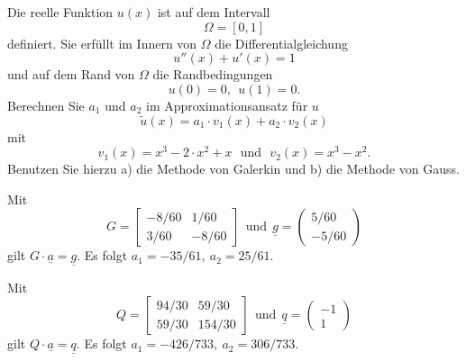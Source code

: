 Die reelle Funktion $u(x)$ ist auf dem Intervall
\[
\Omega = [0, 1]
\]
definiert. Sie erfüllt im Innern von $\Omega$ die Differentialgleichung
\[
u''(x) + u'(x) = 1
\]
und auf dem Rand von $\Omega$ die Randbedingungen
\[
u(0) = 0, \ \ u(1) = 0.
\]
Berechnen Sie $a_1$ und $a_2$ im Approximationsansatz für $u$
\[
\tilde u(x) = a_1 \cdot v_1(x) + a_2 \cdot v_2(x)
\]
mit
\[
v_1(x) = x^3 - 2 \cdot x^2 + x \ \ \ \text{und} \ \ \  v_2(x) = x^3 - x^2.
\]
Benutzen Sie hierzu  a) die Methode von Galerkin und b) die Methode von Gauss.

\begin{loesung}
\begin{teilaufgaben}
\item
Mit 
\[
G = \left[\begin{array}{rr} -8/60 & 1/60 \\ 3/60 & -8/60  \end{array}\right] \ \ \text{und} \ \
  \underline{g} =  \left(\begin{array}{r} 5/60  \\ - 5/60 \end{array}\right)
\]
gilt $G \cdot \underline{a} = \underline{g}.$ Es folgt $a_1 = -35/61, \ a_2 = 25/61$.

\item
Mit
\[
Q = \left[\begin{array}{rr} 94/30 & 59/30 \\ 59/30 & 154/30  \end{array}\right] \ \ \text{und} \ \
  \underline{q} =  \left(\begin{array}{r} -1  \\ 1 \end{array}\right)
\]
gilt $Q \cdot \underline{a} = \underline{q}$.
Es folgt $a_1 = -426/733, \ a_2 = 306/733$.
\end{teilaufgaben}
\end{loesung}

